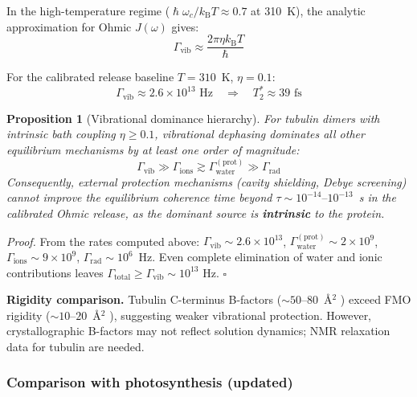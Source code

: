 \documentclass[twocolumn,10pt]{article}
\renewcommand{\hbar}{\hslash}
\newcommand{\kB}{k_{\text{B}}}
\newcommand{\fs}{\text{~fs}}
\newcommand{\Hz}{\text{~Hz}}
\newtheorem{proposition}{Proposition}
\begin{document}
In the high-temperature regime ($\hbar\omega_c / \kB T \approx 0.7$ at
310~K), the analytic approximation for Ohmic $J(\omega)$ gives:
\begin{equation}
\Gamma_{\text{vib}} \approx \frac{2\pi \eta \kB T}{\hbar}
\end{equation}

For the calibrated release baseline $T = 310$~K, $\eta = 0.1$:
\begin{equation}
\boxed{\Gamma_{\text{vib}} \approx 2.6\times 10^{13}\Hz
\quad \Rightarrow \quad T_2^* \approx 39\fs}
\label{eq:tau_vib_boxed}
\end{equation}

\begin{proposition}[Vibrational dominance hierarchy]
\label{prop:vib_dominance}
For tubulin dimers with intrinsic bath coupling $\eta \geq 0.1$,
vibrational dephasing dominates all other equilibrium mechanisms by at
least one order of magnitude:
\begin{equation}
\Gamma_{\text{vib}} \gg \Gamma_{\text{ions}} \gtrsim
\Gamma_{\text{water}}^{(\text{prot})} \gg \Gamma_{\text{rad}}
\end{equation}
Consequently, external protection mechanisms (cavity shielding, Debye
screening) cannot improve the equilibrium coherence time beyond
$\tau \sim 10^{-14}\text{--}10^{-13}$~s in the calibrated Ohmic release,
as the dominant source is \textbf{intrinsic} to the
protein.
\end{proposition}

\textit{Proof.} From the rates computed above:
$\Gamma_{\text{vib}} \sim 2.6\times 10^{13}$,
$\Gamma_{\text{water}}^{(\text{prot})} \sim 2\times 10^{9}$,
$\Gamma_{\text{ions}} \sim 9\times 10^{9}$,
$\Gamma_{\text{rad}} \sim 10^6$~Hz. Even complete elimination of water and
ionic contributions leaves
$\Gamma_{\text{total}} \geq \Gamma_{\text{vib}} \sim 10^{13}\Hz$.
\hfill $\square$

\textbf{Rigidity comparison.} Tubulin C-terminus B-factors
($\sim 50\text{--}80$~\AA$^2$ \cite{Nogales1998}) exceed FMO rigidity
($\sim 10\text{--}20$~\AA$^2$ \cite{Adolphs2006}), suggesting weaker
vibrational protection. However, crystallographic B-factors may not reflect
solution dynamics; NMR relaxation data for tubulin are needed.


\subsubsection{Comparison with photosynthesis (updated)}
\end{document}
